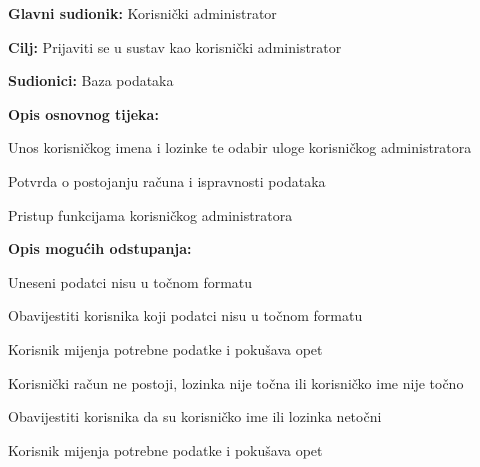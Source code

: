				\noindent {}
				\begin{packed_item}
					
					\item \textbf{Glavni sudionik: }Korisnički administrator
					\item  \textbf{Cilj:} Prijaviti se u sustav kao korisnički administrator
					\item  \textbf{Sudionici:} Baza podataka
					\item  \textbf{Opis osnovnog tijeka:}
					
					\item[] \begin{packed_enum}
						
						\item Unos korisničkog imena i lozinke te odabir uloge korisničkog administratora
						\item Potvrda o postojanju računa i ispravnosti podataka
						\item Pristup funkcijama korisničkog administratora
					\end{packed_enum}
					
					\item  \textbf{Opis mogućih odstupanja:}
					
					\item[] \begin{packed_item}
						
						\item[2.a] Uneseni podatci nisu u točnom formatu
						\item[] \begin{packed_enum}
							
							\item Obavijestiti korisnika koji podatci nisu u točnom formatu
							\item Korisnik mijenja potrebne podatke i pokušava opet
							
						\end{packed_enum}
						\item[2.b] Korisnički račun ne postoji, lozinka nije točna ili korisničko ime nije točno
						\item[] \begin{packed_enum}
							
							\item Obavijestiti korisnika da su korisničko ime ili lozinka netočni
							\item Korisnik mijenja potrebne podatke i pokušava opet
							
						\end{packed_enum}
						
						
					\end{packed_item}
				\end{packed_item}
				
